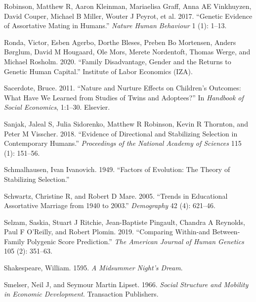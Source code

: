 \documentclass[
  12pt,
]{article}
\newlength{\cslhangindent}
\newlength{\cslentryspacingunit} %
\newenvironment{CSLReferences}[2] %
 {%
  \setlength{\parindent}{0pt}
  \ifodd #1
  \let\oldpar\par
  \def\par{\hangindent=\cslhangindent\oldpar}
  \fi
  \setlength{\parskip}{#2\cslentryspacingunit}
 }%
 {}
\theoremstyle{definition}
\theoremstyle{definition}
\theoremstyle{definition}
\theoremstyle{definition}
\theoremstyle{remark}
\begin{document}
\begin{CSLReferences}{1}{0}
\leavevmode{}%
Robinson, Matthew R, Aaron Kleinman, Mariaelisa Graff, Anna AE Vinkhuyzen, David Couper, Michael B Miller, Wouter J Peyrot, et al. 2017. {``Genetic Evidence of Assortative Mating in Humans.''} \emph{Nature Human Behaviour} 1 (1): 1--13.

\leavevmode{}%
Ronda, Victor, Esben Agerbo, Dorthe Bleses, Preben Bo Mortensen, Anders Børglum, David M Hougaard, Ole Mors, Merete Nordentoft, Thomas Werge, and Michael Rosholm. 2020. {``Family Disadvantage, Gender and the Returns to Genetic Human Capital.''} Institute of Labor Economics (IZA).

\leavevmode{}%
Sacerdote, Bruce. 2011. {``Nature and Nurture Effects on Children's Outcomes: What Have We Learned from Studies of Twins and Adoptees?''} In \emph{Handbook of Social Economics}, 1:1--30. Elsevier.

\leavevmode{}%
Sanjak, Jaleal S, Julia Sidorenko, Matthew R Robinson, Kevin R Thornton, and Peter M Visscher. 2018. {``Evidence of Directional and Stabilizing Selection in Contemporary Humans.''} \emph{Proceedings of the National Academy of Sciences} 115 (1): 151--56.

\leavevmode{}%
Schmalhausen, Ivan Ivanovich. 1949. {``Factors of Evolution: The Theory of Stabilizing Selection.''}

\leavevmode{}%
Schwartz, Christine R, and Robert D Mare. 2005. {``Trends in Educational Assortative Marriage from 1940 to 2003.''} \emph{Demography} 42 (4): 621--46.

\leavevmode{}%
Selzam, Saskia, Stuart J Ritchie, Jean-Baptiste Pingault, Chandra A Reynolds, Paul F O'Reilly, and Robert Plomin. 2019. {``Comparing Within-and Between-Family Polygenic Score Prediction.''} \emph{The American Journal of Human Genetics} 105 (2): 351--63.

\leavevmode{}%
Shakespeare, William. 1595. \emph{A Midsummer Night's Dream}.

\leavevmode{}%
Smelser, Neil J, and Seymour Martin Lipset. 1966. \emph{Social Structure and Mobility in Economic Development}. Transaction Publishers.


\end{CSLReferences}
\end{document}
